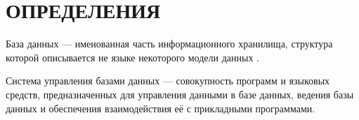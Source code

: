 \section*{\centering ОПРЕДЕЛЕНИЯ}




База данных --- именованная часть информационного хранилища, структура которой описывается не языке некоторого модели данных \cite{definebase}.

Система управления базами данных --- совокупность программ и языковых средств, предназначенных для управления данными в базе данных, ведения базы данных и обеспечения взаимодействия её с прикладными программами.
